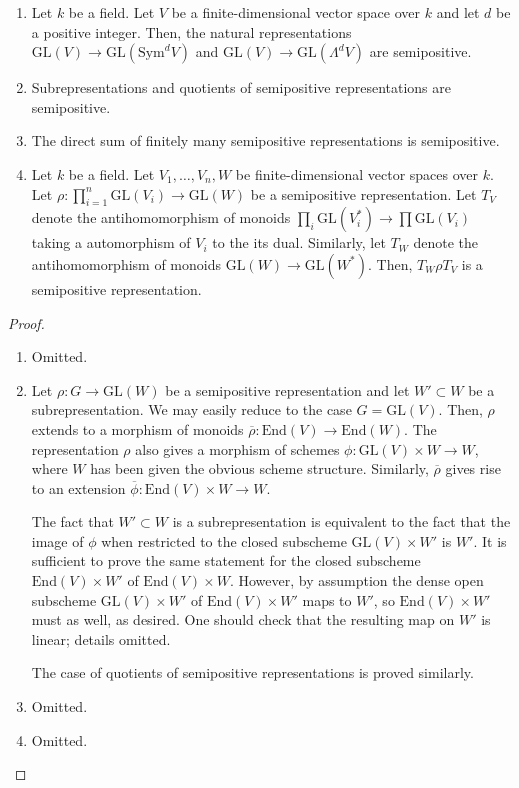 \begin{lemma}\label{semipos_rep_examples}
\begin{enumerate}
\item\label{sym_and_wedge_semipos} Let $k$ be a field. 
Let $V$ be a finite-dimensional vector space over $k$ and let $d$ be a positive integer. Then, the natural representations $\mathrm{GL}(V)\to \mathrm{GL}(\mathrm{Sym}^dV)$ and $\mathrm{GL}(V)\to \mathrm{GL}(\Lambda^dV)$ are semipositive.
\item\label{subreps_and_quotients_semipos} Subrepresentations and quotients of semipositive representations are semipositive.
\item The direct sum of finitely many semipositive representations is semipositive.
\item 
Let $k$ be a field. 
Let $V_1,\ldots,V_n,W$ be finite-dimensional vector spaces over $k$.
Let $\rho:\prod_{i=1}^{n}\mathrm{GL}(V_i)\rightarrow \mathrm{GL}(W)$ be a semipositive representation. 
Let $T_V$ denote the antihomomorphism of monoids $\prod_i\mathrm{GL}(V_i^*)\to\prod\mathrm{GL}(V_i)$ taking a automorphism of $V_i$ to the its dual.
Similarly, let $T_W$ denote the antihomomorphism of monoids $\mathrm{GL}(W)\to\mathrm{GL}(W^*)$.
Then, $T_W\rho T_V$ is a semipositive representation.
\end{enumerate}
\end{lemma}

\begin{proof}
\begin{enumerate}
\item Omitted.
\item Let $\rho:G\to \mathrm{GL}(W)$ be a semipositive representation and let $W'\subset W$ be a subrepresentation. 
We may easily reduce to the case $G=\mathrm{GL}(V)$.
Then, $\rho$ extends to a morphism of monoids $\overline{\rho}:\mathrm{End}(V)\to \mathrm{End}(W)$. 
The representation $\rho$ also gives a morphism of schemes $\phi:\mathrm{GL}(V)\times W\to W$, where $W$ has been given the obvious scheme structure. 
Similarly, $\overline{\rho}$ gives rise to an extension $\overline{\phi}:\mathrm{End}(V)\times W\to W$. 

The fact that $W'\subset W$ is a subrepresentation is equivalent to the fact that the image of $\phi$ when restricted to the closed subscheme $\mathrm{GL}(V)\times W'$ is $W'$. 
It is sufficient to prove the same statement for the closed subscheme $\mathrm{End}(V)\times W'$ of $\mathrm{End}(V)\times W$. 
However, by assumption the dense open subscheme $\mathrm{GL}(V)\times W'$ of $\mathrm{End}(V)\times W'$ maps to $W'$, so $\mathrm{End}(V)\times W'$ must as well, as desired. One should check that the resulting map on $W'$ is linear; details omitted.                                                                                                                                                                                                                                  

The case of quotients of semipositive representations is proved similarly.
\item Omitted.
\item Omitted.
\end{enumerate}
\end{proof}


